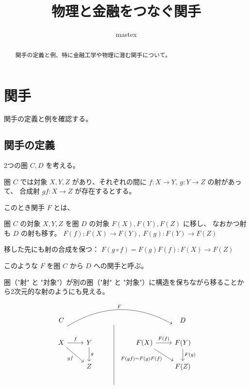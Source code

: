 \documentclass[uplatex,a4j,12pt,dvipdfmx]{jsarticle}
\title{
物理と金融をつなぐ関手
}
\author{
mastex
}
\begin{document}
\maketitle

\begin{abstract}
	関手の定義と例、特に金融工学や物理に潜む関手について。
\end{abstract}


\section{関手}

関手の定義と例を確認する。

\subsection{関手の定義}

2つの圏 $C,D$ を考える。

圏 $C$ では対象 $X,Y,Z$ があり、それぞれの間に
$f: X \to Y , \ g: Y \to Z$
の射があって、
合成射
$gf: X \to  Z$
が存在するとする。

このとき関手 $F$ とは、

圏 $C$ の対象 $X,Y,Z$ を圏 $D$ の対象 $F(X),F(Y),F(Z)$ に移し、
なおかつ射も $D$ の射も移す。
$F(f): F(X) \to F(Y) , \ F(g): F(Y) \to F(Z)$

移した先にも射の合成を保つ：
$F(g \circ f) = F(g) F(f): F(X) \to F(Z)$

このような $F$ を圏 $C$ から $D$ への関手と呼ぶ。

圏（"射" と "対象"）が別の圏（"射" と "対象"）に構造を保ちながら移ることから2次元的な射のようにも見える。

\[
	\begin{tikzcd}
		C                                                                             &                  & {}                      &                                                        & D                      \\
		X \arrow[r, "f"] \arrow[rd, "gf"'] \arrow[rrrr, "F", bend left, shift left=8] & Y \arrow[d, "g"] &                         & F(X) \arrow[r, "F(f)"] \arrow[rd, "F(gf) = F(g)F(f)"'] & F(Y) \arrow[d, "F(g)"] \\
		& Z                &                         &                                                        & F(Z)                   \\
		&                  & {} \arrow[uuu, no head] &                                                        &
	\end{tikzcd}
\]
\end{document}
